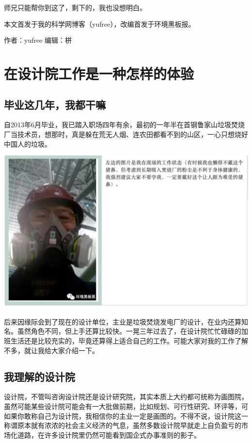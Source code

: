 \documentclass[]{book}
\begin{document}
师兄只能帮你到这了，剩下的，我也没想明白。

本文首发于我的科学网博客（yufree），改编首发于环境黑板报。

作者：yufree 编辑：栟

\section{在设计院工作是一种怎样的体验}

\subsection{毕业这几年，我都干嘛}

自2013年6月毕业，我已踏入职场四年有余，最初的一年半在首钢鲁家山垃圾焚烧厂当技术员，想那时，真是躲在荒无人烟、连农田都看不到的山区，一心只想烧好中国人的垃圾。

\includegraphics[width=8.33in]{images/sisi1}

后来因缘际会到了现在的设计单位，主业是垃圾焚烧发电厂的设计，在业内还算知名。虽然角色不同，但上手还算比较快。一晃三年过去了，在设计院忙忙碌碌的加班生活还是比较充实的，毕竟还算得上适合自己的工作。可能大家对我的工作了解不多，就让我给大家介绍一下。

\subsection{我理解的设计院}

设计院，不管叫咨询设计院还是设计研究院，其实本质上大约都可统称为画图院，虽然可能某些设计院可能会有一大批做前期，比如规划、可行性研究、环评等，可如果你敢称自己为设计院，我相信你的主业一定是画图的。不得不说，设计院这一称谓原本就有浓浓的社会主义经济的气息，虽然多数设计院早就走上自负盈亏的市场化道路，在许多设计院里仍然可能看到国企式办事准则的影子。
\end{document}
